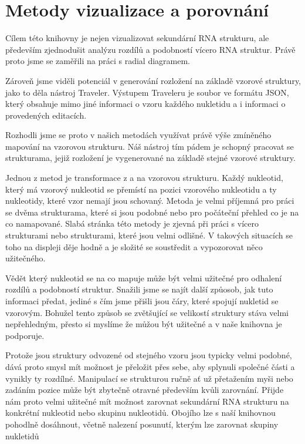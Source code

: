 
\chapter{Metody vizualizace a porovnání}

Cílem této knihovny je nejen vizualizovat sekundární RNA strukturu, ale
především zjednodušit analýzu rozdílů a podobností vícero RNA struktur. Právě
proto jsme se zaměřili na práci s radial diagramem.

Zároveň jsme viděli potenciál v generování rozložení na základě vzorové
struktury, jako to děla nástroj Traveler. Výstupem Traveleru je soubor ve
formátu JSON, který obsahuje mimo jiné informaci o vzoru každého nukletidu a i
informaci o provedených editacích.

Rozhodli jsme se proto v našich metodách využívat právě výše zmíněného mapování
na vzorovou strukturu. Náš nástroj tím pádem je schopný pracovat se
strukturama, jejiž rozložení je vygenerované na základě stejné vzorové
struktury.

Jednou z metod je transformace z a na vzorovou strukturu. Každý nukleotid,
který má vzorový nukleotid se přemístí na pozici vzorového nukleotidu a ty
nukleotidy, které vzor nemají jsou schovaný. Metoda je velmi příjemná pro práci
se dvěma strukturama, které si jsou podobné nebo pro počáteční přehled co je na
co namapované. Slabá stránka této metody je zjevná při práci s vícero
strukturami nebo strukturami, které jsou velmi odlišné. V takových situacích se
toho na displeji děje hodně a je složité se soustředit a vypozorovat něco
užitečného.

Vědět který nukleotid se na co mapuje může být velmi užitečné pro odhalení
rozdílů a podobností struktur. Snažili jsme se najít další způosob, jak tuto
informaci předat, jediné s čím jsme přišli jsou čáry, které spojují nukletid se
vzorovým. Bohužel tento způsob se zvětšující se velikostí struktury stáva velmi
nepřehledným, přesto si myslíme že můžou být užitečné a v naše knihovna je
podporuje.

Protože jsou struktury odvozené od stejného vzoru jsou typicky velmi podobné,
dává proto smysl mít možnost je přeložit přes sebe, aby splynuli společné části
a vynikly ty rozdílné. Manipulací se strukturou ručně ať už přetažením myši
nebo zadáním pozice může být zbytečně otravné především kvůli zarovnání. Přijde
nám proto velmi užitečné mít možnost zarovnat sekundární RNA strukturu na
konkrétní nukleotid nebo skupinu nukleotidů. Obojího lze s naší knihovnou
pohodlně dosáhnout, včetně nalezení posunutí, kterým lze zarovnat skupiny
nukletidů

